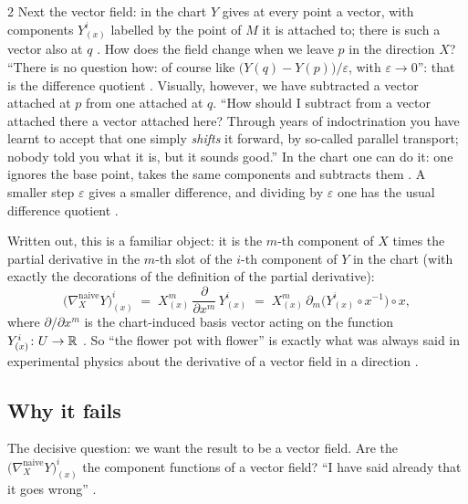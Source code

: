 \begin{paracol}{2}
Next the vector field: in the chart $Y$ gives at every point a vector, with components $Y^i_{(x)}$ labelled by the point of $M$ it is
attached to; there is such a vector also at $q$ . How does the field change when we leave $p$ in the direction
$X$? ``There is no question how: of course like $\bigl(Y(q)-Y(p)\bigr)/\varepsilon$, with $\varepsilon\to0$'': that is
the difference quotient . Visually, however, we have subtracted a vector attached at $p$ from one attached at
$q$. ``How should I subtract from a vector attached there a vector attached here? Through years of indoctrination you have
learnt to accept that one simply \emph{shifts} it forward, by so-called parallel transport; nobody told you what it is, but it
sounds good.'' In the chart one can do it: one ignores the base point, takes the same components and subtracts them
. A smaller step $\varepsilon$ gives a smaller difference, and dividing by $\varepsilon$ one has the usual
difference quotient .

Written out, this is a familiar object: it is the $m$-th component of $X$ times the partial derivative in the $m$-th slot of the
$i$-th component of $Y$ in the chart (with exactly the decorations of the definition of the partial derivative):
\begin{equation}\label{eq:cf-naive}
  \bigl(\nabla^{\text{naive}}_XY\bigr)^i_{(x)}
  \;=\;X^m_{(x)}\,\frac{\partial}{\partial x^m}\,Y^i_{(x)}\;=\;X^m_{(x)}\,\partial_m\bigl(Y^i_{(x)}\circ x^{-1}\bigr)\circ x ,
\end{equation}
where $\partial/\partial x^m$ is the chart-induced basis vector acting on the function $Y^i_{(x)}\colon U\to\mathbb{R}$ .
So ``the flower pot with flower'' is exactly what was always said in experimental physics about the derivative of a vector field
in a direction .

\subsection{Why it fails}

The decisive question: we want the result to be a vector field. Are the $\bigl(\nabla^{\text{naive}}_XY\bigr)^i_{(x)}$ the
component functions of a vector field? ``I have said already that it goes wrong'' .


\end{paracol}

